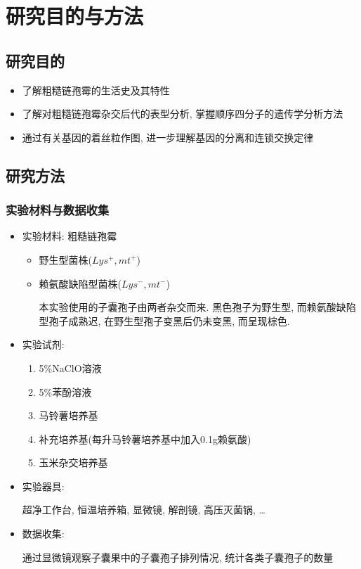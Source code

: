 \documentclass[]{LZUThesis}
\begin{document}
\chapter{研究目的与方法}
\section{研究目的}
\begin{itemize}
    \item 了解粗糙链孢霉的生活史及其特性
    \item 了解对粗糙链孢霉杂交后代的表型分析, 掌握顺序四分子的遗传学分析方法
    \item 通过有关基因的着丝粒作图, 进一步理解基因的分离和连锁交换定律
\end{itemize}

\section{研究方法}
\subsection{实验材料与数据收集}
\begin{itemize}
    \item 实验材料: 粗糙链孢霉
    \begin{itemize}
        \item 野生型菌株($Lys^+,mt^+$)
        \item 赖氨酸缺陷型菌株($Lys^-,mt^-$)\par
        本实验使用的子囊孢子由两者杂交而来. 黑色孢子为野生型, 而赖氨酸缺陷型孢子成熟迟, 在野生型孢子变黑后仍未变黑, 而呈现棕色.
    \end{itemize}
    \item 实验试剂:
    \begin{enumerate}
        \item 5\%NaClO溶液
        \item 5\%苯酚溶液
        \item 马铃薯培养基
        \item 补充培养基(每升马铃薯培养基中加入0.1g赖氨酸)
        \item 玉米杂交培养基
    \end{enumerate}
    \item 实验器具:\par
    超净工作台, 恒温培养箱, 显微镜, 解剖镜, 高压灭菌锅, \ldots
    \item 数据收集: \par
    通过显微镜观察子囊果中的子囊孢子排列情况, 统计各类子囊孢子的数量
\end{itemize}
\end{document}
